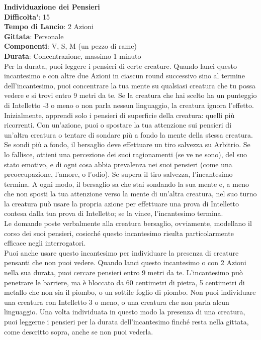 \begin{multicols}{2}
\medskip\textbf{Individuazione dei Pensieri}\\
\textbf{Difficolta'}: 15\\
\textbf{Tempo di Lancio}: 2 Azioni\\
\textbf{Gittata}: Personale\\
\textbf{Componenti}: V, S, M (un pezzo di rame)\\
\textbf{Durata}: Concentrazione, massimo 1 minuto\\
Per la durata, puoi leggere i pensieri di certe creature. Quando lanci questo incantesimo e con altre due Azioni in ciascun round successivo sino al termine dell’incantesimo, puoi concentrare la tua mente su qualsiasi creatura che tu possa vedere e si trovi entro 9 metri da te. Se la creatura che hai scelto ha un punteggio di Intelletto -3 o meno o non parla nessun linguaggio, la creatura ignora l’effetto.\\
Inizialmente, apprendi solo i pensieri di superficie della creatura: quelli più ricorrenti. Con un’azione, puoi o spostare la tua attenzione sui pensieri di un’altra creatura o tentare di sondare più a fondo la mente della stessa creatura. Se sondi più a fondo, il bersaglio deve effettuare un tiro salvezza su Arbitrio. Se lo fallisce, ottieni una percezione dei suoi ragionamenti (se ve ne sono), del suo stato emotivo, e di ogni cosa abbia prevalenza nei suoi pensieri (come una preoccupazione, l’amore, o l’odio). Se supera il tiro salvezza, l’incantesimo termina. A ogni modo, il bersaglio sa che stai sondando la sua mente e, a meno che non sposti la tua attenzione verso la mente di un’altra creatura, nel suo turno la creatura può usare la propria azione per effettuare una prova di Intelletto contesa dalla tua prova di Intelletto; se la vince, l’incantesimo termina.\\
Le domande poste verbalmente alla creatura bersaglio, ovviamente, modellano il corso dei suoi pensieri, cosicché questo incantesimo risulta particolarmente efficace negli interrogatori.\\
Puoi anche usare questo incantesimo per individuare la presenza di creature pensanti che non puoi vedere. Quando lanci questo incantesimo o con 2 Azioni nella sua durata, puoi cercare pensieri entro 9 metri da te. L’incantesimo può penetrare le barriere, ma è bloccato da 60 centimetri di pietra, 5 centimetri di metallo che non sia il piombo, o un sottile foglio di piombo. Non puoi individuare una creatura con Intelletto 3 o meno, o una creatura che non parla alcun linguaggio. Una volta individuata in questo modo la presenza di una creatura, puoi leggerne i pensieri per la durata dell’incantesimo finché resta nella gittata, come descritto sopra, anche se non puoi vederla.


\end{multicols}
